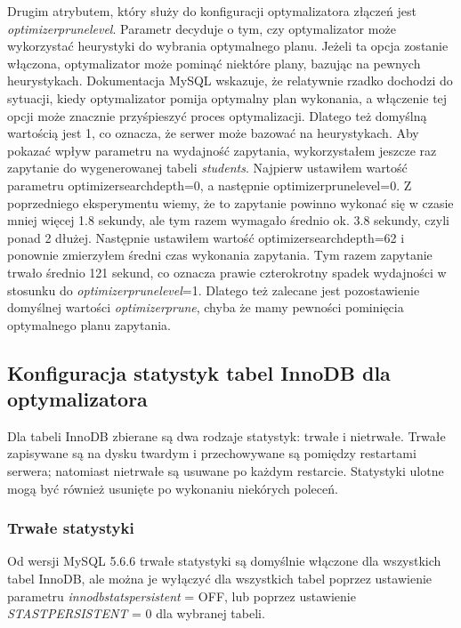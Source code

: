 Drugim atrybutem, który służy do konfiguracji optymalizatora złączeń jest \textit{optimizer\textunderscore prune\textunderscore level}. Parametr decyduje o tym, czy optymalizator może wykorzystać heurystyki do wybrania optymalnego planu. Jeżeli ta opcja zostanie włączona, optymalizator może pominąć niektóre plany, bazując na pewnych heurystykach. Dokumentacja MySQL wskazuje, że relatywnie rzadko dochodzi do sytuacji, kiedy optymalizator pomija optymalny plan wykonania, a włączenie tej opcji może znacznie przyśpieszyć proces optymalizacji. Dlatego też domyślną wartością jest 1, co oznacza, że serwer może bazować na heurystykach. Aby pokazać wpływ parametru na wydajność zapytania, wykorzystałem jeszcze raz zapytanie do wygenerowanej tabeli \textit{students}. Najpierw ustawiłem wartość parametru optimizer\textunderscore search\textunderscore depth=0, a następnie optimizer\textunderscore prune\textunderscore level=0. Z poprzedniego eksperymentu wiemy, że to zapytanie powinno wykonać się w czasie mniej więcej 1.8 sekundy, ale tym razem wymagało średnio ok. 3.8 sekundy, czyli ponad 2 dłużej. Następnie ustawiłem wartość optimizer\textunderscore search\textunderscore depth=62 i ponownie zmierzyłem średni czas wykonania zapytania. Tym razem zapytanie trwało średnio 121 sekund, co oznacza prawie czterokrotny spadek wydajności w stosunku do
\textit{optimizer\textunderscore prune\textunderscore level}=1. Dlatego też zalecane jest pozostawienie domyślnej wartości \textit{ optimizer\textunderscore prune}, chyba że mamy pewności pominięcia optymalnego planu zapytania.

\subsection{Konfiguracja statystyk tabel InnoDB dla optymalizatora}
Dla tabeli InnoDB zbierane są dwa rodzaje statystyk: trwałe i nietrwałe. Trwałe zapisywane są na dysku twardym i przechowywane są pomiędzy restartami serwera; natomiast nietrwałe są usuwane po każdym restarcie. Statystyki ulotne mogą być również usunięte po wykonaniu niekórych poleceń. 

\subsubsection{Trwałe statystyki}
Od wersji MySQL 5.6.6 trwałe statystyki są domyślnie włączone dla wszystkich tabel InnoDB, ale można je wyłączyć dla wszystkich tabel poprzez ustawienie parametru \textit{innodb\textunderscore stats\textunderscore persistent} = OFF, lub poprzez ustawienie \textit{STAST\textunderscore PERSISTENT} = 0 dla wybranej tabeli.


